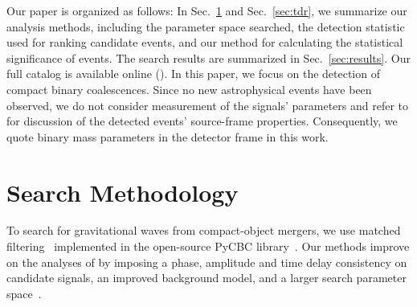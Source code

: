 Our paper is organized as follows: In Sec.~\ref{sec:search} and Sec.~\ref{sec:tdr}, we summarize our analysis methods, including the parameter space searched, the detection statistic used for ranking candidate events, and our method for calculating the statistical significance of events. The search results are summarized in Sec.~\ref{sec:results}.  Our full catalog 
is available online (\release). In this paper, we focus on the detection of compact binary coalescences. Since no new astrophysical events have been observed, we do not consider measurement of the signals' parameters and refer to \cite{TheLIGOScientific:2016pea,Biwer:2018osg} for discussion of the detected events' source-frame properties. Consequently, we quote binary mass parameters in the detector frame in this work.

\section{Search Methodology}
\label{sec:search}

To search for gravitational waves from compact-object mergers, we use matched filtering~\citep{Allen:2005fk} implemented in the open-source PyCBC library~\citep{Usman:2015kfa,Canton:2014ena,pycbc-github}. Our methods improve on the analyses of \cite{TheLIGOScientific:2016pea,Abbott:2016ymx,TheLIGOScientific:2016qqj} by imposing a phase, amplitude and time delay consistency on candidate signals, an improved background model, and a larger search parameter space~\citep{Nitz:2017svb, Nitz:2017lco, DalCanton:2017ala}.


